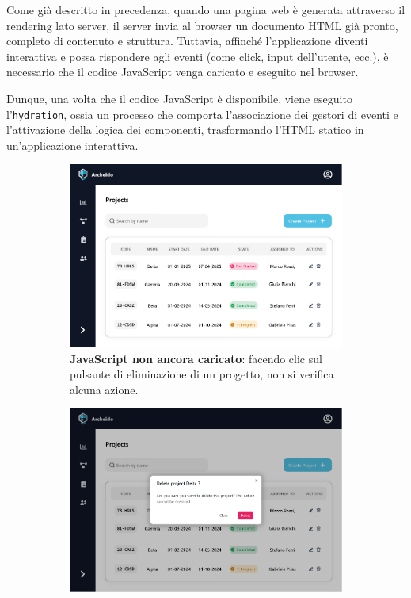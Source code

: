 \documentclass[target=bach,aauheader=,style=]{thud}
\begin{document}
\noindent Come già descritto in precedenza, quando una pagina web è generata attraverso il rendering lato server, il server invia al browser un documento HTML già pronto, completo di contenuto e struttura. Tuttavia, affinché l'applicazione diventi interattiva e possa rispondere agli eventi (come click, input dell'utente, ecc.), è necessario che il codice JavaScript venga caricato e eseguito nel browser. 

\noindent Dunque, una volta che il codice JavaScript è disponibile, viene eseguito l'\texttt{hydration}, ossia un processo che comporta l'associazione dei gestori di eventi e l'attivazione della logica dei componenti, trasformando l'HTML statico in un'applicazione interattiva.

\begin{figure}[H]
    \centering
    \begin{subfigure}[b]{0.46\textwidth}
        \centering
        \includegraphics[width=\textwidth]{img/hydration/hydration1.pdf}
        \caption{\textbf{JavaScript non ancora caricato}: facendo clic sul pulsante di eliminazione di un progetto, non si verifica alcuna azione.}
        \label{fig:img1}
    \end{subfigure}
    \hfill
    \begin{subfigure}[b]{0.46\textwidth}
        \centering
        \includegraphics[width=\textwidth]{img/hydration/hydration2.pdf}

\end{subfigure}
\end{figure}
\end{document}
